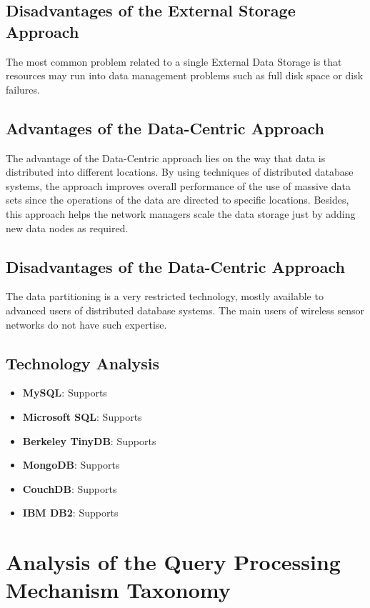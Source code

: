 \subsection{Disadvantages of the External Storage Approach}

The most common problem related to a single External Data Storage is that
resources may run into data management problems such as full disk space or disk
failures.

\subsection{Advantages of the Data-Centric Approach}

The advantage of the Data-Centric approach lies on the way that data is
distributed into different locations. By using techniques of distributed
database systems, the approach improves overall performance of the use of
massive data sets since the operations of the data are directed to specific
locations. Besides, this approach helps the network managers scale the data
storage just by adding new data nodes as required.

\subsection{Disadvantages of the Data-Centric Approach}

The data partitioning is a very restricted technology, mostly available to
advanced users of distributed database systems. The main users of wireless
sensor networks do not have such expertise.

\subsection{Technology Analysis}

\begin{itemize}
  \item \textbf{MySQL}: Supports
  \item \textbf{Microsoft SQL}: Supports
  \item \textbf{Berkeley TinyDB}: Supports
  \item \textbf{MongoDB}: Supports
  \item \textbf{CouchDB}: Supports
  \item \textbf{IBM DB2}: Supports
\end{itemize}

\section{Analysis of the Query Processing Mechanism Taxonomy}

